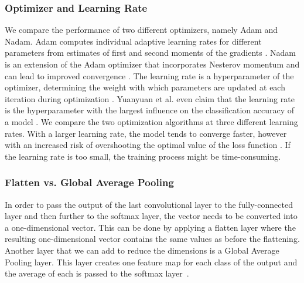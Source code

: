 \documentclass[sn-mathphys,Numbered]{sn-jnl}%
\theoremstyle{thmstyleone}%
\theoremstyle{thmstyletwo}%
\theoremstyle{thmstylethree}%
\begin{document}
\subsubsection{Optimizer and Learning Rate}
\label{learningrate}
We compare the performance of two different optimizers, namely Adam and Nadam. Adam computes individual adaptive learning rates for different parameters from estimates of first and second moments of the gradients \cite{kingma2017adam}. Nadam is an extension of the Adam optimizer that incorporates Nesterov momentum and can lead to improved convergence \cite{dozat.2016}.
The learning rate is a hyperparameter of the optimizer, determining the weight with which parameters are updated at each iteration during optimization \cite{Brownlee_2020}. Yuanyuan et al. even claim that the learning rate is the hyperparameter with the largest influence on the classification accuracy of a model \cite{Yuanyuan_2020}. We compare the two optimization algorithms at three different learning rates. With a larger learning rate, the model tends to converge faster, however with an increased risk of overshooting the optimal value of the loss function \cite{Brownlee_2020}. If the learning rate is too small, the training process might be time-consuming.
\subsubsection{Flatten vs. Global Average Pooling}
\label{fullyConnected}
In order to pass the output of the last convolutional layer to the fully-connected layer and then further to the softmax layer, the vector needs to be converted into a one-dimensional vector. This can be done by applying a flatten layer where the resulting one-dimensional vector contains the same values as before the flattening.\\
Another layer that we can add to reduce the dimensions is a Global Average Pooling layer. This layer creates one feature map for each class of the output and the average of each is passed to the softmax layer~\cite{Admin_2023}.
\end{document}
